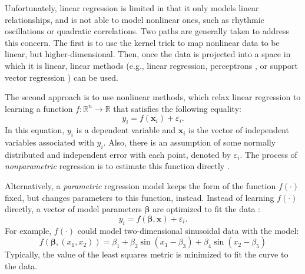 Unfortunately, linear regression is limited in that it only models linear relationships, and is not able to model nonlinear ones, such as rhythmic oscillations or quadratic correlations.
Two paths are generally taken to address this concern.
The first is to use the kernel trick \cite{muller2001introduction} to map nonlinear data to be linear, but higher-dimensional.
Then, once the data is projected into a space in which it is linear, linear methods (e.g., linear regression, perceptrons \cite{minsky19882perceptrons}, or support vector regression \cite{smola2004tsv}) can be used.

The second approach is to use nonlinear methods, which relax linear regression to learning a function $f: \mathbb{R}^n \rightarrow \mathbb{R}$ that satisfies the following equality:
\[y_i = f(\mathbf x_i) + \varepsilon_i.\]
In this equation, $y_i$ is a dependent variable and $\mathbf x_i$ is the vector of independent variables associated with $y_i$.
Also, there is an assumption of some normally distributed and independent error with each point, denoted by $\varepsilon_i$.
The process of \textit{nonparametric} regression is to estimate this function directly \cite{fox2002r}.

Alternatively, a \textit{parametric} regression model keeps the form of the function $f(\cdot)$ fixed, but changes parameters to this function, instead.
Instead of learning $f(\cdot)$ directly, a vector of model parameters $\mathbf \beta$ are optimized to fit the data \cite{fox2002r}:
\[y_i = f(\mathbf \beta, \mathbf x) + \varepsilon_i.\]
For example, $f(\cdot)$ could model two-dimensional sinusoidal data with the model:
\[f(\mathbf \beta, (x_1, x_2)) = \beta_1 + \beta_2 \sin (x_1 - \beta_3) + \beta_4 \sin (x_2 - \beta_5)\]
Typically, the value of the least squares metric is minimized to fit the curve to the data.

